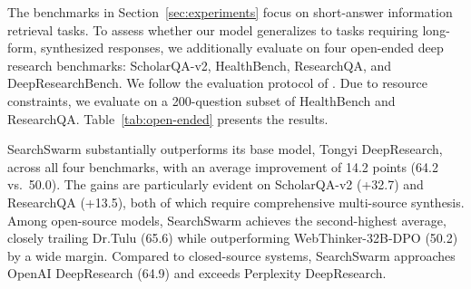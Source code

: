 \documentclass[table]{gtech}
\begin{document}
\begin{table}[t]
\centering
\caption{Results on open-ended deep research benchmarks. Due to resource constraints, we evaluate on a 200-question subset of HealthBench and ResearchQA. Average is computed only when all four scores are available. \textbf{Bold} indicates the best result among open-source models.}
\label{tab:open-ended}
\end{table}

The benchmarks in Section~\ref{sec:experiments} focus on short-answer information retrieval tasks. To assess whether our model generalizes to tasks requiring long-form, synthesized responses, we additionally evaluate on four open-ended deep research benchmarks: ScholarQA-v2, HealthBench, ResearchQA, and DeepResearchBench. We follow the evaluation protocol of \citet{shao2025dr}. Due to resource constraints, we evaluate on a 200-question subset of HealthBench and ResearchQA. Table~\ref{tab:open-ended} presents the results.

SearchSwarm substantially outperforms its base model, Tongyi DeepResearch, across all four benchmarks, with an average improvement of 14.2 points (64.2 vs.\ 50.0). The gains are particularly evident on ScholarQA-v2 (+32.7) and ResearchQA (+13.5), both of which require comprehensive multi-source synthesis. Among open-source models, SearchSwarm achieves the second-highest average, closely trailing Dr.Tulu (65.6) while outperforming WebThinker-32B-DPO (50.2) by a wide margin. Compared to closed-source systems, SearchSwarm approaches OpenAI DeepResearch (64.9) and exceeds Perplexity DeepResearch.
\end{document}
